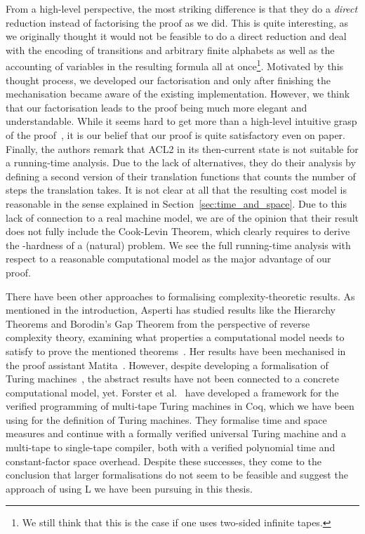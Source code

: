 From a high-level perspective, the most striking difference is that they do a \textit{direct} reduction instead of factorising the proof as we did. This is quite interesting, as we originally thought it would not be feasible to do a direct reduction and deal with the encoding of transitions and arbitrary finite alphabets as well as the accounting of variables in the resulting formula all at once\footnote{We still think that this is the case if one uses two-sided infinite tapes.}. Motivated by this thought process, we developed our factorisation and only after finishing the mechanisation became aware of the existing implementation.
However, we think that our factorisation leads to the proof being much more elegant and understandable. While it seems hard to get more than a high-level intuitive grasp of the proof~\cite{gamboa:cook}, it is our belief that our proof is quite satisfactory even on paper.
Finally, the authors remark that ACL2 in its then-current state is not suitable for a running-time analysis. Due to the lack of alternatives, they do their analysis by defining a second version of their translation functions that counts the number of steps the translation takes. It is not clear at all that the resulting cost model is reasonable in the sense explained in Section~\ref{sec:time_and_space}.
Due to this lack of connection to a real machine model, we are of the opinion that their result does not fully include the Cook-Levin Theorem, which clearly requires to derive the \NP{}-hardness of a (natural) problem.
We see the full running-time analysis with respect to a reasonable computational model as the major advantage of our proof.

There have been other approaches to formalising complexity-theoretic results. As mentioned in the introduction, Asperti has studied results like the Hierarchy Theorems and Borodin's Gap Theorem from the perspective of reverse complexity theory, examining what properties a computational model needs to satisfy to prove the mentioned theorems~\cite{asperti:reverse_complexity, asperti:borodin}. Her results have been mechanised in the proof assistant Matita~\cite{matita_web}. However, despite developing a formalisation of Turing machines~\cite{asperti_ricciotti}, the abstract results have not been connected to a concrete computational model, yet.
Forster et al.~\cite{ForsterEtAl:2019:VerifiedTMs} have developed a framework for the verified programming of multi-tape Turing machines in Coq, which we have been using for the definition of Turing machines. They formalise time and space measures and continue with a formally verified universal Turing machine and a multi-tape to single-tape compiler, both with a verified polynomial time and constant-factor space overhead. Despite these successes, they come to the conclusion that larger formalisations do not seem to be feasible and suggest the approach of using L we have been pursuing in this thesis.

